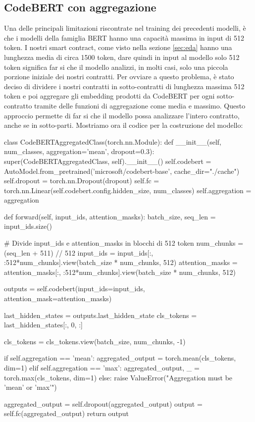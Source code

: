 \documentclass[../../Thesis.tex]{subfiles}
\begin{document}
\subsection{CodeBERT con aggregazione}
Una delle principali limitazioni riscontrate nel training dei precedenti modelli, è che i modelli della famiglia BERT hanno una capacità massima in input di 512 token. I nostri smart contract, come visto nella sezione \ref{sec:eda} hanno una lunghezza media di circa 1500 token, dare quindi in input al modello solo 512 token significa far si che il modello analizzi, in molti casi, solo una piccola porzione iniziale dei nostri contratti. Per ovviare a questo problema, è stato deciso di dividere i nostri contratti in sotto-contratti di lunghezza massima 512 token e poi aggregare gli embedding prodotti da CodeBERT per ogni sotto-contratto tramite delle funzioni di aggregazione come media e massimo. Questo approccio permette di far si che il modello possa analizzare l'intero contratto, anche se in sotto-parti. Mostriamo ora il codice per la costruzione del modello: 
\begin{python}
    class CodeBERTAggregatedClass(torch.nn.Module):
        def __init__(self, num_classes, aggregation='mean', dropout=0.3):
            super(CodeBERTAggregatedClass, self).__init__()
            self.codebert = AutoModel.from_pretrained('microsoft/codebert-base', cache_dir="./cache")
            self.dropout = torch.nn.Dropout(dropout)
            self.fc = torch.nn.Linear(self.codebert.config.hidden_size, num_classes)
            self.aggregation = aggregation

        def forward(self, input_ids, attention_masks):
            batch_size, seq_len = input_ids.size()

            # Divide input_ids e attention_masks in blocchi di 512 token
            num_chunks = (seq_len + 511) // 512
            input_ids = input_ids[:, :512*num_chunks].view(batch_size * num_chunks, 512)
            attention_masks = attention_masks[:, :512*num_chunks].view(batch_size * num_chunks, 512)

            outputs = self.codebert(input_ids=input_ids, attention_mask=attention_masks)

            last_hidden_states = outputs.last_hidden_state
            cls_tokens = last_hidden_states[:, 0, :]

            cls_tokens = cls_tokens.view(batch_size, num_chunks, -1)

            if self.aggregation == 'mean':
                aggregated_output = torch.mean(cls_tokens, dim=1)
            elif self.aggregation == 'max':
                aggregated_output, _ = torch.max(cls_tokens, dim=1)
            else:
                raise ValueError("Aggregation must be 'mean' or 'max'")

            aggregated_output = self.dropout(aggregated_output)
            output = self.fc(aggregated_output)
            return output
\end{python}
\end{document}
